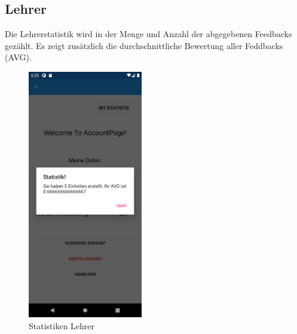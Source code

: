 \subsection{Lehrer}
Die Lehrerstatistik wird in der Menge und Anzahl der abgegebenen Feedbacks gezählt. Es zeigt zusätzlich die durchschnittliche Bewertung aller Feddbacks (AVG).
\begin{figure}[h]
    \begin{center}
        \includegraphics[width=5cm]{pics/Xamarin Lehrer/1 Stat.png}\hfill
        \caption[Statistiken]{Statistiken Lehrer}
        \end{center}
\end{figure}
\newpage